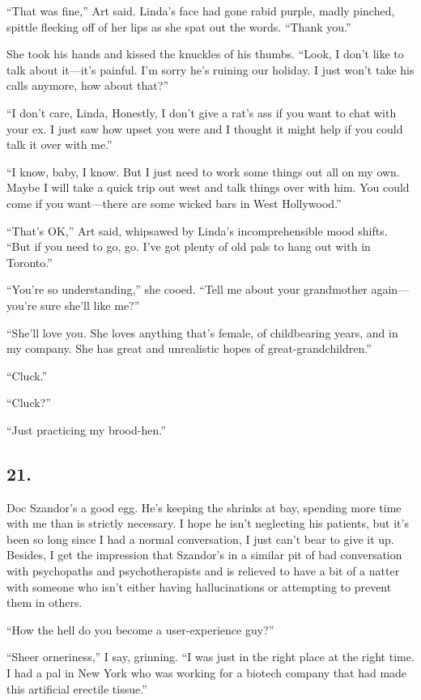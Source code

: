 “That was fine,” Art said. Linda’s face had gone rabid purple,
madly pinched, spittle flecking off of her lips as she spat out the
words. “Thank you.”

She took his hands and kissed the knuckles of his thumbs. “Look, I
don’t like to talk about it—it’s painful. I’m sorry he’s ruining
our holiday. I just won’t take his calls anymore, how about that?”

“I don’t care, Linda, Honestly, I don’t give a rat’s ass if you
want to chat with your ex. I just saw how upset you were and I
thought it might help if you could talk it over with me.”

“I know, baby, I know. But I just need to work some things out all
on my own. Maybe I will take a quick trip out west and talk things
over with him. You could come if you want—there are some wicked
bars in West Hollywood.”

“That’s OK,” Art said, whipsawed by Linda’s incomprehensible mood
shifts. “But if you need to go, go. I’ve got plenty of old pals to
hang out with in Toronto.”

“You’re so understanding,” she cooed. “Tell me about your
grandmother again—you’re sure she’ll like me?”

“She’ll love you. She loves anything that’s female, of childbearing
years, and in my company. She has great and unrealistic hopes of
great-grandchildren.”

“Cluck.”

“Cluck?”

“Just practicing my brood-hen.”

\subsection{21.}

Doc Szandor’s a good egg. He’s keeping the shrinks at bay, spending
more time with me than is strictly necessary. I hope he isn’t
neglecting his patients, but it’s been so long since I had a normal
conversation, I just can’t bear to give it up. Besides, I get the
impression that Szandor’s in a similar pit of bad conversation with
psychopaths and psychotherapists and is relieved to have a bit of a
natter with someone who isn’t either having hallucinations or
attempting to prevent them in others.

“How the hell do you become a user-experience guy?”

“Sheer orneriness,” I say, grinning. “I was just in the right place
at the right time. I had a pal in New York who was working for a
biotech company that had made this artificial erectile tissue.”

